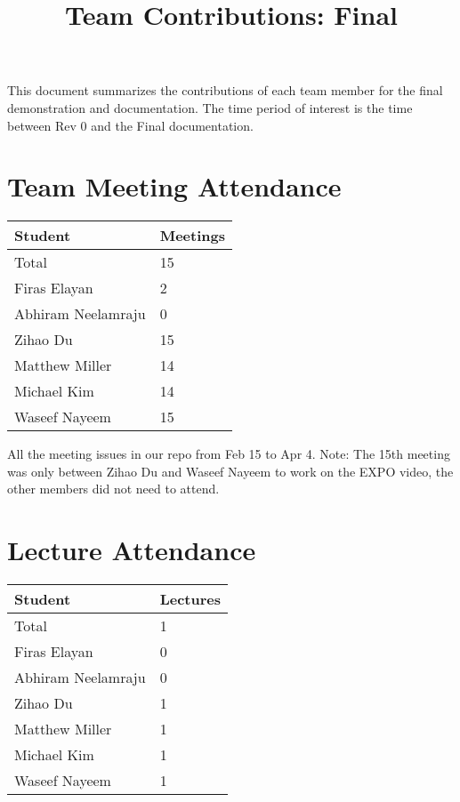 \documentclass{article}
\title{Team Contributions: Final\\\progname}
\author{\authname}
\date{}
\begin{document}
\maketitle

This document summarizes the contributions of each team member for the final
demonstration and documentation.  The time period of interest is the time
between Rev 0 and the Final documentation.

\section{Team Meeting Attendance}
\begin{table}[H]
\centering
\begin{tabular}{ll}
\toprule
\textbf{Student} & \textbf{Meetings}\\
\midrule
Total & 15\\
Firas Elayan & 2\\
Abhiram Neelamraju & 0\\
 Zihao Du & 15\\
 Matthew Miller & 14\\
 Michael Kim & 14\\
 Waseef Nayeem & 15\\
\bottomrule
\end{tabular}
\end{table}
All the meeting issues in our repo from Feb 15 to Apr 4. Note: The 15th meeting was only between Zihao Du and Waseef Nayeem to work on the EXPO video, the other members did not need to attend.

\section{Lecture Attendance}

\begin{table}[H]
\centering
\begin{tabular}{ll}
\toprule
\textbf{Student} & \textbf{Lectures}\\
\midrule
Total & 1\\
Firas Elayan & 0\\
Abhiram Neelamraju & 0\\
 Zihao Du & 1\\
 Matthew Miller & 1\\
 Michael Kim & 1\\
 Waseef Nayeem & 1\\
\bottomrule
\end{tabular}
\end{table}
\end{document}
